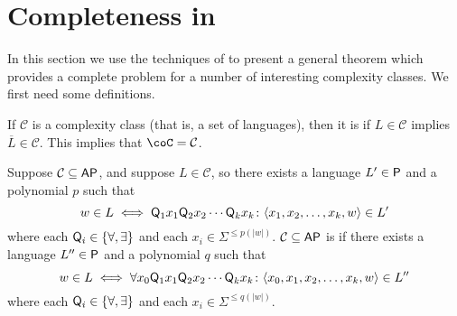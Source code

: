 \section{Completeness in \texorpdfstring{\AP}{AP}}

In this section we use the techniques of \cite[Theorem~8.7]{bcffm} to present a general theorem which provides a complete problem for a number of interesting complexity classes.
We first need some definitions.

If $\mathcal{C}$ is a complexity class (that is, a set of languages), then it is  if $L\in\mathcal{C}$ implies $\overline{L}\in\mathcal{C}$.
This implies that $\coC=\mathcal{C}$.

Suppose $\mathcal{C}\subseteq\AP$, and suppose $L\in\mathcal{C}$, so there exists a language $L'\in\P$ and a polynomial $p$ such that
\begin{displaymath}
  w\in L \iff \Q_1x_1\Q_2x_2\cdots \Q_kx_k\colon \langle x_1, x_2, \ldots, x_k, w\rangle\in L'
\end{displaymath}
where each $\Q_i\in\{\forall, \exists\}$ and each $x_i\in\Sigma^{\leq p(|w|)}$.
$\mathcal{C}\subseteq\AP$ is  if there exists a language $L''\in\P$ and a polynomial $q$ such that
\begin{displaymath}
  w\in L \iff \forall x_0 \Q_1x_1\Q_2x_2\cdots \Q_kx_k\colon \langle x_0, x_1, x_2, \ldots, x_k, w \rangle\in L''
\end{displaymath}
where each $\Q_i\in\{\forall, \exists\}$ and each $x_i\in\Sigma^{\leq q(|w|)}$.

